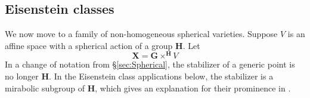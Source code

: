 \documentclass{amsart}
\theoremstyle{definition}
\theoremstyle{remark}
\newtheorem{remark}[theorem]{Remark}
\newcommand{\1}{\mathbf{1}}
\newcommand{\GL}{\mathrm{GL}}
\newcommand{\mb}[1]{\mathbf{#1}}
\newcommand{\U}{\mathrm{U}}
\theoremstyle{definition}
\newcommand{\bG}{\mathbf{G}}
\begin{document}
%
%

\subsection{Eisenstein classes}\label{ss:Eisenstein}
We now move to a family of non-homogeneous spherical varieties. Suppose $V$ is an affine space with a spherical action of a group $\mb{H}$. Let
\[
  \mb{X}=\mb{G}\times^{\mb{H}} V
\]
In a change of notation from \S\ref{sec:Spherical}, the stabilizer of a generic point is no longer $\mb{H}$. In the Eisenstein class applications below, the stabilizer is a mirabolic subgroup of $\mb{H}$, which gives an explanation for their prominence in \cite{LoefflerSpherical}.
\end{document}
